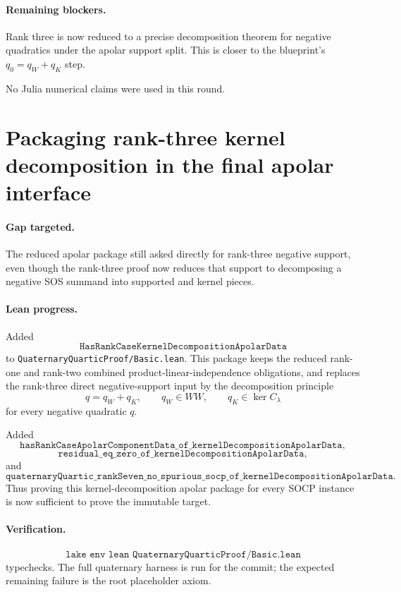 \documentclass[11pt]{article}
\begin{document}
\paragraph{Remaining blockers.}
Rank three is now reduced to a precise decomposition theorem for negative
quadratics under the apolar support split.  This is closer to the blueprint’s
\(q_0=q_W+q_K\) step.

No Julia numerical claims were used in this round.

\section*{Packaging rank-three kernel decomposition in the final apolar interface}

\paragraph{Gap targeted.}
The reduced apolar package still asked directly for rank-three negative support,
even though the rank-three proof now reduces that support to decomposing a
negative SOS summand into supported and kernel pieces.

\paragraph{Lean progress.}
Added
\[
\texttt{HasRankCaseKernelDecompositionApolarData}
\]
to \texttt{QuaternaryQuarticProof/Basic.lean}.  This package keeps the reduced
rank-one and rank-two combined product-linear-independence obligations, and
replaces the rank-three direct negative-support input by the decomposition
principle
\[
q=q_W+q_K,\qquad q_W\in WW,\qquad q_K\in\ker C_\lambda
\]
for every negative quadratic \(q\).

Added
\[
\texttt{hasRankCaseApolarComponentData\_of\_kernelDecompositionApolarData},
\]
\[
\texttt{residual\_eq\_zero\_of\_kernelDecompositionApolarData},
\]
and
\[
\texttt{quaternaryQuartic\_rankSeven\_no\_spurious\_socp\_of\_kernelDecompositionApolarData}.
\]
Thus proving this kernel-decomposition apolar package for every SOCP instance
is now sufficient to prove the immutable target.

\paragraph{Verification.}
\[
\texttt{lake env lean QuaternaryQuarticProof/Basic.lean}
\]
typechecks.  The full quaternary harness is run for the commit; the expected
remaining failure is the root placeholder axiom.
\end{document}
